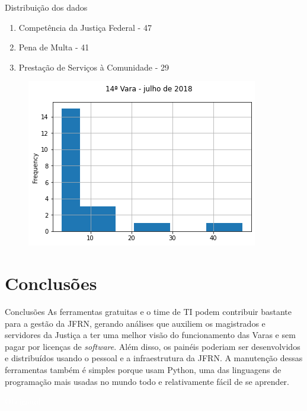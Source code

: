 \documentclass[10pt,t]{beamer}
\begin{document}
\begin{frame}{Distribuição dos dados}
	\begin{enumerate}
		\item Competência da Justiça Federal - 47
		\item Pena de Multa - 41
		\item Prestação de Serviços à Comunidade - 29
	\end{enumerate}
	\begin{figure}
		\centering
		\includegraphics[scale=0.50]{./imagens/Vara_14_julho_2018.png}
	\end{figure}
\end{frame}

\section{Conclusões}

\begin{frame}{Conclusões}
	As ferramentas gratuitas e o time de TI podem contribuir bastante para a gestão da JFRN, gerando análises que auxiliem os magistrados e servidores da Justiça a ter uma melhor visão do funcionamento das Varas e sem pagar por licenças de \textit{software}. Além disso, os painéis poderiam ser desenvolvidos e distribuídos usando o pessoal e a infraestrutura da JFRN. A manutenção dessas ferramentas também é simples porque usam Python, uma das linguagens de programação mais usadas no mundo todo e relativamente fácil de se aprender.
\end{frame}

\begin{frame}[c,plain]{}
    \centering
    \textcolor{white}{Obrigado!}
\end{frame}
\end{document}
